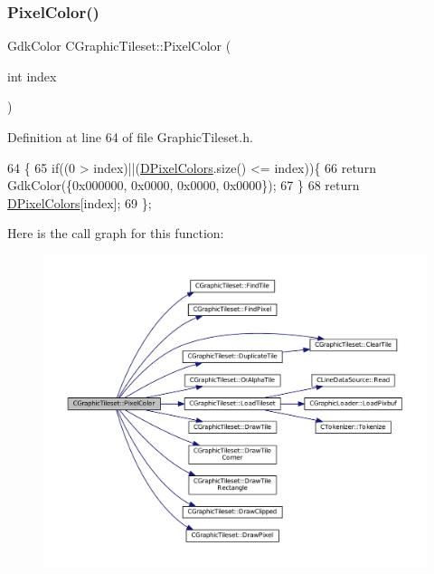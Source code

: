 \subsubsection{\texorpdfstring{Pixel\+Color()}{PixelColor()}}
{\footnotesize\ttfamily Gdk\+Color C\+Graphic\+Tileset\+::\+Pixel\+Color (\begin{DoxyParamCaption}\item[{int}]{index }\end{DoxyParamCaption})\hspace{0.3cm}{\ttfamily [inline]}}



Definition at line 64 of file Graphic\+Tileset.\+h.


\begin{DoxyCode}
64                                       \{
65             \textcolor{keywordflow}{if}((0 > index)||(\hyperlink{classCGraphicTileset_a4e9672b8b133dbac600fb8bb400d1cb3}{DPixelColors}.size() <= index))\{
66                 \textcolor{keywordflow}{return} GdkColor(\{0x000000, 0x0000, 0x0000, 0x0000\});
67             \}
68             \textcolor{keywordflow}{return} \hyperlink{classCGraphicTileset_a4e9672b8b133dbac600fb8bb400d1cb3}{DPixelColors}[index];
69         \};
\end{DoxyCode}
Here is the call graph for this function\+:\nopagebreak
\begin{figure}[H]
\begin{center}
\leavevmode
\includegraphics[width=350pt]{classCGraphicTileset_af278c60b01100c430bedfcedd9e9489f_cgraph}
\end{center}
\end{figure}
\hypertarget{classCGraphicTileset_af99f4b0ce58d25a5baaf836c74472910}{}\label{classCGraphicTileset_af99f4b0ce58d25a5baaf836c74472910} 
